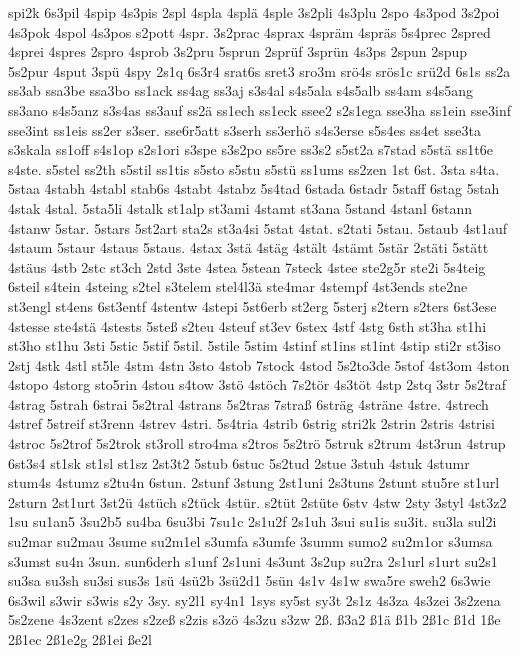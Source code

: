 {spi2k
6s3pil
4spip
4s3pis
2spl
4spla
4splä
4sple
3s2pli
4s3plu
2spo
4s3pod
3s2poi
4s3pok
4spol
4s3pos
s2pott
4spr.
3s2prac
4sprax
4spräm
4spräs
5s4prec
2spred
4sprei
4spres
2spro
4sprob
3s2pru
5sprun
2sprüf
3sprün
4s3ps
2spun
2spup
5s2pur
4sput
3spü
4spy
2s1q
6s3r4
srat6s
sret3
sro3m
srö4s
srös1c
srü2d
6s1s
ss2a
ss3ab
ssa3be
ssa3bo
ss1ack
ss4ag
ss3aj
s3s4al
s4s5ala
s4s5alb
ss4am
s4s5ang
ss3ano
s4s5anz
s3s4as
ss3auf
ss2ä
ss1ech
ss1eck
ssee2
s2s1ega
sse3ha
ss1ein
sse3inf
sse3int
ss1eis
ss2er
s3ser.
sse6r5att
s3serh
ss3erhö
s4s3erse
s5s4es
ss4et
sse3ta
s3skala
ss1off
s4s1op
s2s1ori
s3spe
s3s2po
ss5re
ss3s2
s5st2a
s7stad
s5stä
ss1t6e
s4ste.
s5stel
ss2th
s5stil
ss1tis
s5sto
s5stu
s5stü
ss1ums
ss2zen
1st
6st.
3sta
s4ta.
5staa
4stabh
4stabl
stab6s
4stabt
4stabz
5s4tad
6stada
6stadr
5staff
6stag
5stah
4stak
4stal.
5sta5li
4stalk
st1alp
st3ami
4stamt
st3ana
5stand
4stanl
6stann
4stanw
5star.
5stars
5st2art
sta2s
st3a4si
5stat
4stat.
s2tati
5stau.
5staub
4st1auf
4staum
5staur
4staus
5staus.
4stax
3stä
4stäg
4stält
4stämt
5stär
2stäti
5stätt
4stäus
4stb
2stc
st3ch
2std
3ste
4stea
5stean
7steck
4stee
ste2g5r
ste2i
5s4teig
6steil
s4tein
4steing
s2tel
s3telem
stel4l3ä
ste4mar
4stempf
4st3ends
ste2ne
st3engl
st4ens
6st3entf
4stentw
4stepi
5st6erb
st2erg
5sterj
s2tern
s2ters
6st3ese
4stesse
ste4stä
4stests
5steß
s2teu
4steuf
st3ev
6stex
4stf
4stg
6sth
st3ha
st1hi
st3ho
st1hu
3sti
5stic
5stif
5stil.
5stile
5stim
4stinf
st1ins
st1int
4stip
sti2r
st3iso
2stj
4stk
4stl
st5le
4stm
4stn
3sto
4stob
7stock
4stod
5s2to3de
5stof
4st3om
4ston
4stopo
4storg
sto5rin
4stou
s4tow
3stö
4stöch
7s2tör
4s3töt
4stp
2stq
3str
5s2traf
4strag
5strah
6strai
5s2tral
4strans
5s2tras
7straß
6sträg
4sträne
4stre.
4strech
4stref
5streif
st3renn
4strev
4stri.
5s4tria
4strib
6strig
stri2k
2strin
2stris
4strisi
4stroc
5s2trof
5s2trok
st3roll
stro4ma
s2tros
5s2trö
5struk
s2trum
4st3run
4strup
6st3s4
st1sk
st1sl
st1sz
2st3t2
5stub
6stuc
5s2tud
2stue
3stuh
4stuk
4stumr
stum4s
4stumz
s2tu4n
6stun.
2stunf
3stung
2st1uni
2s3tuns
2stunt
stu5re
st1url
2sturn
2st1urt
3st2ü
4stüch
s2tück
4stür.
s2tüt
2stüte
6stv
4stw
2sty
3styl
4st3z2
1su
su1an5
3su2b5
su4ba
6su3bi
7su1c
2s1u2f
2s1uh
3sui
su1is
su3it.
su3la
sul2i
su2mar
su2mau
3sume
su2m1el
s3umfa
s3umfe
3summ
sumo2
su2m1or
s3umsa
s3umst
su4n
3sun.
sun6derh
s1unf
2s1uni
4s3unt
3s2up
su2ra
2s1url
s1urt
su2s1
su3sa
su3sh
su3si
sus3s
1sü
4sü2b
3sü2d1
5sün
4s1v
4s1w
swa5re
sweh2
6s3wie
6s3wil
s3wir
s3wis
s2y
3sy.
sy2l1
sy4n1
1sys
sy5st
sy3t
2s1z
4s3za
4s3zei
3s2zena
5s2zene
4s3zent
s2zes
s2zeß
s2zis
s3zö
4s3zu
s3zw
2ß.
ß3a2
ß1ä
ß1b
2ß1c
ß1d
1ße
2ß1ec
2ß1e2g
2ß1ei
ße2l
}
